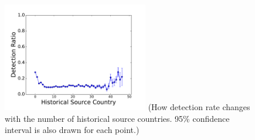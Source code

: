 \begin{figure}[t!]
\begin{center}
\includegraphics[width=2.5in]{figure/SubCountry}
{\footnotesize{(How detection rate changes with the number of historical source countries.
95\% confidence interval is also drawn for each point.)}}
\end{center}
\end{figure}
